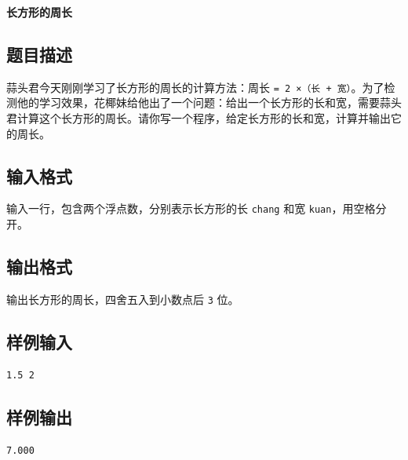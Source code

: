 \documentclass{article}
\newcommand{\problemname}[1]{\begin{center}\Large\bfseries #1\end{center}}
\begin{document}
\problemname{长方形的周长}

\subsection*{题目描述}
蒜头君今天刚刚学习了长方形的周长的计算方法：周长 \texttt{= 2 ×（长 + 宽）}。为了检测他的学习效果，花椰妹给他出了一个问题：给出一个长方形的长和宽，需要蒜头君计算这个长方形的周长。请你写一个程序，给定长方形的长和宽，计算并输出它的周长。

\subsection*{输入格式}
输入一行，包含两个浮点数，分别表示长方形的长 \texttt{chang} 和宽 \texttt{kuan}，用空格分开。

\subsection*{输出格式}
输出长方形的周长，四舍五入到小数点后 \texttt{3} 位。

\subsection*{样例输入}
\begin{verbatim}
1.5 2
\end{verbatim}

\subsection*{样例输出}
\begin{verbatim}
7.000
\end{verbatim}
\end{document}
